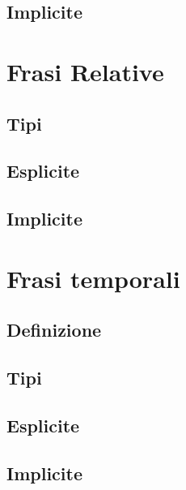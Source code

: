 \documentclass[
  a4paper,
  twoside,
  11pt,
  chapterprefix=false,
  bibliography=totocnumbered,
  listof=flat]{scrbook}
\begin{document}
\hypertarget{implicite}{%
\section{Implicite}\label{implicite}}

\hypertarget{frasi-relative}{%
\chapter{Frasi Relative}\label{frasi-relative}}

\hypertarget{tipi}{%
\section{Tipi}\label{tipi}}

\hypertarget{esplicite-1}{%
\section{Esplicite}\label{esplicite-1}}

\hypertarget{implicite-1}{%
\section{Implicite}\label{implicite-1}}

\hypertarget{frasi-temporali}{%
\chapter{Frasi temporali}\label{frasi-temporali}}

\hypertarget{definizione}{%
\section{Definizione}\label{definizione}}

\hypertarget{tipi-1}{%
\section{Tipi}\label{tipi-1}}

\hypertarget{esplicite-2}{%
\section{Esplicite}\label{esplicite-2}}

\hypertarget{implicite-2}{%
\section{Implicite}\label{implicite-2}}
\end{document}
